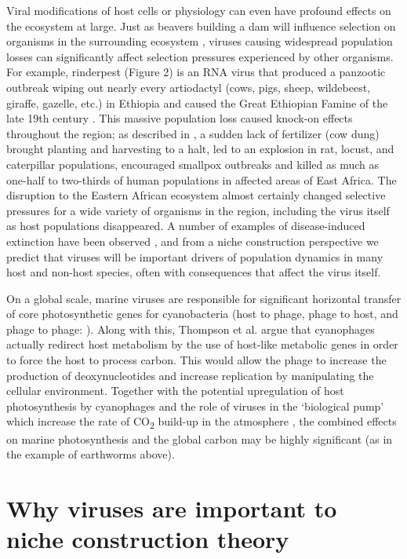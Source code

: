 \documentclass[review,draft,12pt]{elsarticle}
\begin{document}
Viral modifications of host cells or physiology can even have profound
effects on the ecosystem at large. Just as beavers building a dam will
influence selection on organisms in the surrounding ecosystem
\citep{Odling-Smee:2003fk}, viruses causing widespread population losses
can significantly affect selection pressures experienced by other
organisms. For example, rinderpest (Figure 2) is an RNA virus that
produced a panzootic outbreak wiping out nearly every artiodactyl (cows,
pigs, sheep, wildebeest, giraffe, gazelle, etc.) in Ethiopia and caused
the Great Ethiopian Famine of the late 19th century
\citep{Morens:2011qf}. This massive population loss caused knock-on
effects throughout the region; as described in \citep{Morens:2011qf}, a
sudden lack of fertilizer (cow dung) brought planting and harvesting to
a halt, led to an explosion in rat, locust, and caterpillar populations,
encouraged smallpox outbreaks and killed as much as one-half to
two-thirds of human populations in affected areas of East Africa. The
disruption to the Eastern African ecosystem almost certainly changed
selective pressures for a wide variety of organisms in the region,
including the virus itself as host populations disappeared. A number of
examples of disease-induced extinction have been observed
\citep{Castro:2005vn}, and from a niche construction perspective we
predict that viruses will be important drivers of population dynamics in
many host and non-host species, often with consequences that affect the
virus itself.

On a global scale, marine viruses are responsible for significant
horizontal transfer of core photosynthetic genes for cyanobacteria (host
to phage, phage to host, and phage to phage: \citep{Sullivan:2006fk}).
Along with this, Thompson et al. \citep{Thompson:2011cr} argue that
cyanophages actually redirect host metabolism by the use of host-like
metabolic genes in order to force the host to process carbon. This would
allow the phage to increase the production of deoxynucleotides and
increase replication by manipulating the cellular environment. Together
with the potential upregulation of host photosynthesis by cyanophages
\citep{Lindell:2007pi} and the role of viruses in the `biological pump'
which increase the rate of CO\textsubscript{2} build-up in the
atmosphere \citep{Suttle:2005bs}, the combined effects on marine
photosynthesis and the global carbon may be highly significant (as in
the example of earthworms above).

\section{Why viruses are important to niche construction
theory}\label{why-viruses-are-important-to-niche-construction-theory}
\end{document}
